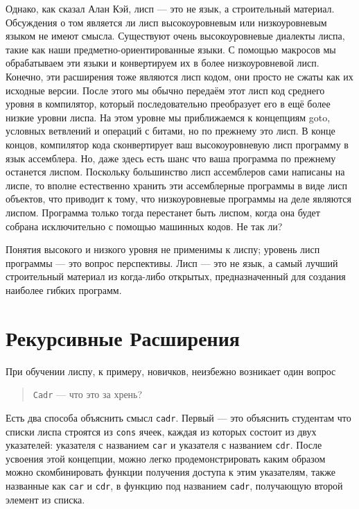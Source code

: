 Однако, как сказал Алан Кэй, лисп --- это не язык, а строительный материал. Обсуждения о том является ли лисп высокоуровневым или низкоуровневым языком не имеют смысла. Существуют очень высокоуровневые диалекты лиспа, такие как наши предметно-ориентированные языки. С помощью макросов мы обрабатываем эти языки и конвертируем их в более низкоуровневой лисп. Конечно, эти расширения тоже являются лисп кодом, они просто не сжаты как их исходные версии. После этого мы обычно передаём этот лисп код среднего уровня в компилятор, который последовательно преобразует его в ещё более низкие уровни лиспа. На этом уровне мы приближаемся к концепциям goto, условных ветвлений и операций с битами, но по прежнему это лисп. В конце концов, компилятор кода сконвертирует ваш высокоуровневую лисп программу в язык ассемблера. Но, даже здесь есть шанс что ваша программа по прежнему останется лиспом. Поскольку большинство лисп ассемблеров сами написаны на лиспе, то вполне естественно хранить эти ассемблерные программы в виде лисп объектов, что приводит к тому, что низкоуровневые программы на деле являются лиспом. Программа только тогда перестанет быть лиспом, когда она будет собрана исключительно с помощью машинных кодов. Не так ли?

Понятия высокого и низкого уровня не применимы к лиспу; уровень лисп программы --- это вопрос перспективы. Лисп --- это не язык, а самый лучший строительный материал из когда-либо открытых, предназначенный для создания наиболее гибких программ.

\section{Рекурсивные Расширения}\label{section_recursive_expansions}

При обучении лиспу, к примеру, новичков, неизбежно возникает один вопрос

\begin{quote}
\verb"Cadr" --- что это за хрень?
\end{quote}

Есть два способа объяснить смысл \verb"cadr". Первый --- это объяснить студентам что списки лиспа строятся из \verb"cons" ячеек, каждая из которых состоит из двух указателей: указателя с названием \verb"car" и указателя с названием \verb"cdr". После усвоения этой концепции, можно легко продемонстрировать каким образом можно скомбинировать функции получения доступа к этим указателям, также названные как \verb"car" и \verb"cdr", в функцию под названием \verb"cadr", получающую второй элемент из списка.

